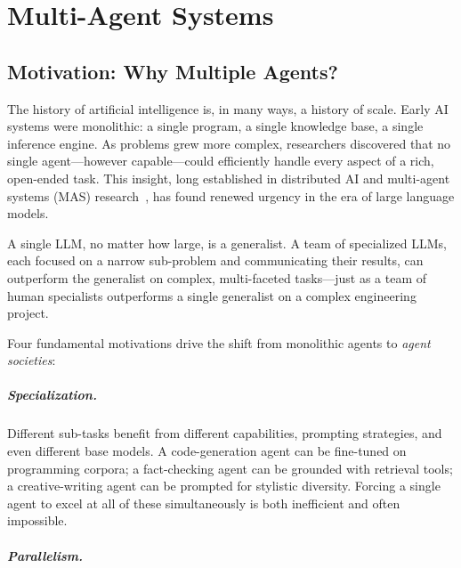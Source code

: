 \chapter{Multi-Agent Systems}
\label{sec:multi-agent-systems}

\section{Motivation: Why Multiple Agents?}
\label{subsec:mas-motivation}

The history of artificial intelligence is, in many ways, a history of scale. Early AI systems were monolithic: a single program, a single knowledge base, a single inference engine. As problems grew more complex, researchers discovered that no single agent---however capable---could efficiently handle every aspect of a rich, open-ended task. This insight, long established in distributed AI and multi-agent systems (MAS) research~\cite{weiss1999multiagent, wooldridge2009introduction}, has found renewed urgency in the era of large language models.

\begin{intuitionbox}
A single LLM, no matter how large, is a generalist. A team of specialized LLMs, each focused on a narrow sub-problem and communicating their results, can outperform the generalist on complex, multi-faceted tasks---just as a team of human specialists outperforms a single generalist on a complex engineering project.
\end{intuitionbox}

Four fundamental motivations drive the shift from monolithic agents to \emph{agent societies}:

\paragraph{Specialization.}
\label{specialization.}

Different sub-tasks benefit from different capabilities, prompting strategies, and even different base models. A code-generation agent can be fine-tuned on programming corpora; a fact-checking agent can be grounded with retrieval tools; a creative-writing agent can be prompted for stylistic diversity. Forcing a single agent to excel at all of these simultaneously is both inefficient and often impossible.

\paragraph{Parallelism.}
\label{parallelism.}


